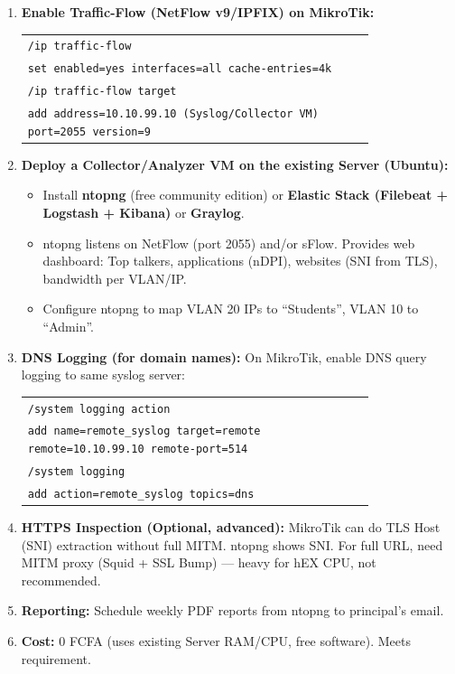 \documentclass[11pt]{article}
\begin{document}
\begin{exoresolu}
\begin{enumerate}
\item \textbf{Enable Traffic-Flow (NetFlow v9/IPFIX) on MikroTik:}
      \begin{center}
      \begin{tabular}{|p{0.8\linewidth}|}\hline
      \texttt{/ip traffic-flow}\\
      \texttt{set enabled=yes interfaces=all cache-entries=4k}\\
      \texttt{/ip traffic-flow target}\\
      \texttt{add address=10.10.99.10 (Syslog/Collector VM) port=2055 version=9}\\\hline
      \end{tabular}
      \end{center}
\item \textbf{Deploy a Collector/Analyzer VM on the existing Server (Ubuntu):}
      \begin{itemize}
      \item Install \textbf{ntopng} (free community edition) or \textbf{Elastic Stack (Filebeat + Logstash + Kibana)} or \textbf{Graylog}.
      \item ntopng listens on NetFlow (port 2055) and/or sFlow. Provides web dashboard: Top talkers, applications (nDPI), websites (SNI from TLS), bandwidth per VLAN/IP.
      \item Configure ntopng to map VLAN 20 IPs to ``Students'', VLAN 10 to ``Admin''.
      \end{itemize}
\item \textbf{DNS Logging (for domain names):} On MikroTik, enable DNS query logging to same syslog server:
      \begin{center}
      \begin{tabular}{|p{0.8\linewidth}|}\hline
      \texttt{/system logging action}\\
      \texttt{add name=remote\_syslog target=remote remote=10.10.99.10 remote-port=514}\\
      \texttt{/system logging}\\
      \texttt{add action=remote\_syslog topics=dns}\\\hline
      \end{tabular}
      \end{center}
\item \textbf{HTTPS Inspection (Optional, advanced):} MikroTik can do TLS Host (SNI) extraction without full MITM. ntopng shows SNI. For full URL, need MITM proxy (Squid + SSL Bump) — heavy for hEX CPU, not recommended.
\item \textbf{Reporting:} Schedule weekly PDF reports from ntopng to principal's email.
\item \textbf{Cost:} 0 FCFA (uses existing Server RAM/CPU, free software). Meets requirement.
\end{enumerate}


\end{exoresolu}
\end{document}
